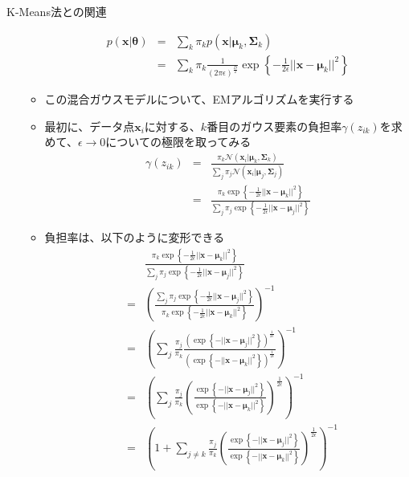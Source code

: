 \documentclass[dvipdfmx,notheorems,t]{beamer}
\begin{document}
\begin{frame}{K-Means法との関連}
\begin{itemize}
\begin{itemize}
		\begin{eqnarray}
			p(\bm{x} | \bm{\theta}) &=& \sum_k \pi_k p(\bm{x} | \bm{\mu}_k, \bm{\Sigma}_k) \\
			&=& \sum_k \pi_k \frac{1}{(2\pi \epsilon)^\frac{D}{2}} \exp \left\{ -\frac{1}{2\epsilon} || \bm{x} - \bm{\mu}_k ||^2 \right\}
		\end{eqnarray}
		
		\item この混合ガウスモデルについて、EMアルゴリズムを実行する
		\newline
		
		\item 最初に、データ点$\bm{x}_i$に対する、$k$番目のガウス要素の負担率$\gamma(z_{ik})$を求めて、$\epsilon \to 0$についての極限を取ってみる
		\begin{eqnarray}
			\gamma(z_{ik}) &=& \frac{\pi_k \mathcal{N}(\bm{x}_i | \bm{\mu}_k, \bm{\Sigma}_k)}{\sum_j \pi_j \mathcal{N}(\bm{x}_i | \bm{\mu}_j, \bm{\Sigma}_j)} \nonumber \\
			&=& \frac{\pi_k \exp \left\{ -\frac{1}{2\epsilon} || \bm{x} - \bm{\mu}_k ||^2 \right\}}{\sum_j \pi_j \exp \left\{ -\frac{1}{2\epsilon} || \bm{x} - \bm{\mu}_j ||^2 \right\}}
		\end{eqnarray}
		
		\item 負担率は、以下のように変形できる
		\begin{eqnarray}
			&& \frac{\pi_k \exp \left\{ -\frac{1}{2\epsilon} || \bm{x} - \bm{\mu}_k ||^2 \right\}}{\sum_j \pi_j \exp \left\{ -\frac{1}{2\epsilon} || \bm{x} - \bm{\mu}_j ||^2 \right\}} \nonumber \\
			&=& \left( \frac{\sum_j \pi_j \exp \left\{ -\frac{1}{2\epsilon} || \bm{x} - \bm{\mu}_j ||^2 \right\}}{\pi_k \exp \left\{ -\frac{1}{2\epsilon} || \bm{x} - \bm{\mu}_k ||^2 \right\}} \right)^{-1} \nonumber \\
			&=& \left( \sum_j \frac{\pi_j}{\pi_k} \frac{\left( \exp \left\{ - || \bm{x} - \bm{\mu}_j ||^2 \right\} \right)^{\frac{1}{2\epsilon}}}{\left( \exp \left\{ - || \bm{x} - \bm{\mu}_k ||^2 \right\} \right)^{\frac{1}{2\epsilon}}} \right)^{-1} \nonumber \\
			&=& \left( \sum_j \frac{\pi_j}{\pi_k} \left( \frac{\exp \left\{ - || \bm{x} - \bm{\mu}_j ||^2 \right\}}{\exp \left\{ - || \bm{x} - \bm{\mu}_k ||^2 \right\}} \right)^{\frac{1}{2\epsilon}} \right)^{-1} \nonumber \\
			&=& \left( 1 + \sum_{j \neq k} \frac{\pi_j}{\pi_k} \left( \frac{\exp \left\{ - || \bm{x} - \bm{\mu}_j ||^2 \right\}}{\exp \left\{ - || \bm{x} - \bm{\mu}_k ||^2 \right\}} \right)^{\frac{1}{2\epsilon}} \right)^{-1}
		\end{eqnarray}
		\newline
		

\end{itemize}
\end{itemize}
\end{frame}
\end{document}
